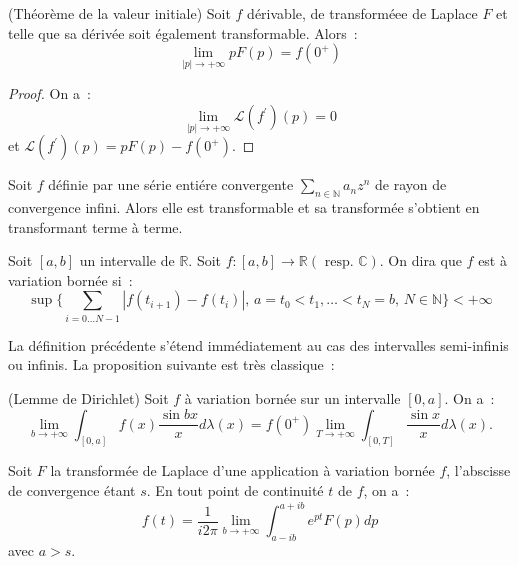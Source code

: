 \begin{fprop}(Théorème de la valeur initiale)
Soit $f$ dérivable, de transforméee de Laplace $F$ et telle que sa
dérivée soit également transformable. Alors~:
\[
\lim_{|p|\to +\infty} p F(p) = f(0^+)
\]
\end{fprop}

\begin{proof}
On a~:
\[
\lim_{|p| \to +\infty} \mathcal{L}(f^\prime)(p) = 0
\]
et $\mathcal{L}(f^\prime)(p) = p F(p) - f(0^+)$.
\end{proof}

\begin{fprop}
Soit $f$ définie par une série entiére convergente $\sum_{n \in
\mathbb{N}} a_n z^n$ de rayon de convergence infini. Alors elle
est transformable et sa transformée s'obtient en transformant terme à terme.
\end{fprop}

\begin{fdefn}
Soit $[a,b]$ un intervalle de $\mathbb{R}$. Soit $f : [a,b] \to \mathbb{R} (\mbox{ resp. } \mathbb{C})$. On dira
que $f$ est à variation bornée si~:
\[
\sup \{ \sum_{i=0\dots N-1} |f(t_{i+1}) - f(t_i)|, \, a = t_0 < t_1, \dots < t_N = b, \, N \in \mathbb{N} \} < + \infty
\]
\end{fdefn}
La définition précédente s'étend immédiatement au cas des intervalles semi-infinis ou infinis.
La proposition suivante est très classique~:
\begin{fprop}(Lemme de Dirichlet)
Soit $f$ à variation bornée sur un intervalle $[0,a]$. On a~:
\[
\lim_{b \to +\infty} \int_{[0,a]} f(x) \frac{\sin bx}{x} d \lambda(x) =
f(0^+) \lim_{T \to +\infty} \int_{[0,T]} \frac{\sin x}{x} d \lambda(x).
\]
\end{fprop}

\begin{fthm}
Soit $F$ la transformée de Laplace d'une application à variation bornée $f$, l'abscisse
de convergence étant $s$. En tout point de continuité $t$ de $f$, on a~:
\[
f(t) = \frac{1}{i 2 \pi} \lim_{b \to + \infty} \int_{a-ib}^{a+ib}
e^{pt} F(p) dp
\]
avec $a > s$.
\end{fthm}

